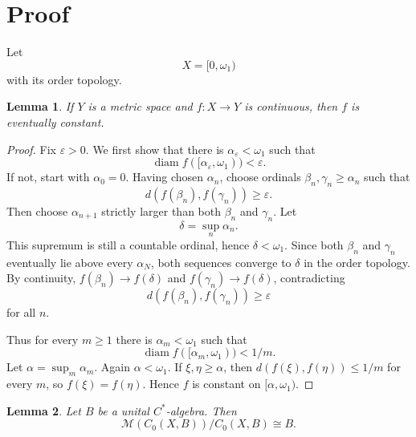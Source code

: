 \documentclass[11pt]{article}
\newtheorem{lemma}{Lemma}
\newcommand{\M}{\mathcal M}
\begin{document}
\section*{Proof}

Let
\[
        X=[0,\omega_1)
\]
with its order topology.

\begin{lemma}
\label{lem:eventually-constant}
If \(Y\) is a metric space and \(f:X\to Y\) is continuous, then \(f\) is
eventually constant.
\end{lemma}

\begin{proof}
Fix \(\varepsilon>0\).  We first show that there is
\(\alpha_\varepsilon<\omega_1\) such that
\[
        \operatorname{diam} f([\alpha_\varepsilon,\omega_1))<\varepsilon.
\]
If not, start with \(\alpha_0=0\).  Having chosen \(\alpha_n\), choose
ordinals \(\beta_n,\gamma_n\ge\alpha_n\) such that
\[
        d(f(\beta_n),f(\gamma_n))\ge\varepsilon.
\]
Then choose \(\alpha_{n+1}\) strictly larger than both \(\beta_n\) and
\(\gamma_n\).
Let
\[
        \delta=\sup_n \alpha_n.
\]
This supremum is still a countable ordinal, hence \(\delta<\omega_1\).  Since
both \(\beta_n\) and \(\gamma_n\) eventually lie above every \(\alpha_N\), both
sequences converge to \(\delta\) in the order topology.  By continuity,
\(f(\beta_n)\to f(\delta)\) and \(f(\gamma_n)\to f(\delta)\), contradicting
\[
        d(f(\beta_n),f(\gamma_n))\ge\varepsilon
\]
for all \(n\).

Thus for every \(m\ge1\) there is \(\alpha_m<\omega_1\) such that
\[
        \operatorname{diam} f([\alpha_m,\omega_1))<1/m.
\]
Let \(\alpha=\sup_m\alpha_m\).  Again \(\alpha<\omega_1\).  If
\(\xi,\eta\ge\alpha\), then \(d(f(\xi),f(\eta))\le 1/m\) for every \(m\), so
\(f(\xi)=f(\eta)\).  Hence \(f\) is constant on \([\alpha,\omega_1)\).
\end{proof}

\begin{lemma}
\label{lem:corona-identification}
Let \(B\) be a unital \(C^*\)-algebra.  Then
\[
        \M(C_0(X,B))/C_0(X,B)\cong B.
\]
\end{lemma}
\end{document}
